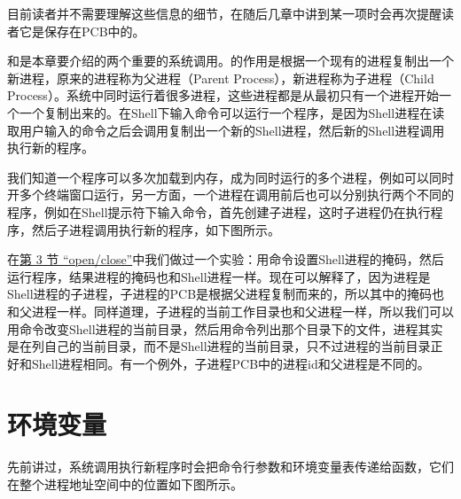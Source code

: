 目前读者并不需要理解这些信息的细节，在随后几章中讲到某一项时会再次提醒读者它是保存在PCB中的。



和是本章要介绍的两个重要的系统调用。的作用是根据一个现有的进程复制出一个新进程，原来的进程称为父进程（Parent Process），新进程称为子进程（Child Process）。系统中同时运行着很多进程，这些进程都是从最初只有一个进程开始一个一个复制出来的。在Shell下输入命令可以运行一个程序，是因为Shell进程在读取用户输入的命令之后会调用复制出一个新的Shell进程，然后新的Shell进程调用执行新的程序。



我们知道一个程序可以多次加载到内存，成为同时运行的多个进程，例如可以同时开多个终端窗口运行，另一方面，一个进程在调用前后也可以分别执行两个不同的程序，例如在Shell提示符下输入命令，首先创建子进程，这时子进程仍在执行程序，然后子进程调用执行新的程序，如下图所示。




在\hyperlink{db.ch28s03.id2851400}{第 3 节 “open/\BookSplit{}close”}中我们做过一个实验：用命令设置Shell进程的掩码，然后运行程序，结果进程的掩码也和Shell进程一样。现在可以解释了，因为进程是Shell进程的子进程，子进程的PCB是根据父进程复制而来的，所以其中的掩码也和父进程一样。同样道理，子进程的当前工作目录也和父进程一样，所以我们可以用命令改变Shell进程的当前目录，然后用命令列出那个目录下的文件，进程其实是在列自己的当前目录，而不是Shell进程的当前目录，只不过进程的当前目录正好和Shell进程相同。有一个例外，子进程PCB中的进程id和父进程是不同的。




\section{环境变量}
%
先前讲过，系统调用执行新程序时会把命令行参数和环境变量表传递给函数，它们在整个进程地址空间中的位置如下图所示。


